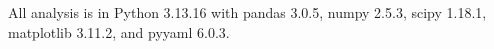 All analysis is in Python 3.13.16 with pandas 3.0.5, numpy 2.5.3, scipy 1.18.1, matplotlib 3.11.2, and pyyaml 6.0.3.
